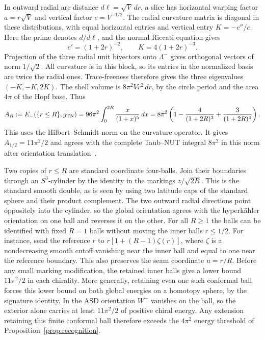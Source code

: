 \documentclass[11pt]{article}
\numberwithin{equation}{section}
\theoremstyle{definition}
\theoremstyle{remark}
\begin{document}
In outward radial arc distance \(d\ell=\sqrt V\,dr\), a slice has
horizontal warping factor \(a=r\sqrt V\) and vertical factor
\(c=V^{-1/2}\). The radial curvature matrix is diagonal in
these distributions, with equal horizontal entries and vertical
entry \(K=-c''/c\). Here the prime denotes \(d/d\ell\), and the
normal Riccati equation gives
\[
 c'=(1+2r)^{-2},\qquad K=4(1+2r)^{-3}.
\]
Projection of the three radial unit bivectors onto \(\Lambda^-\)
gives orthogonal vectors of norm \(1/\sqrt2\). All curvature is in
this block, so its entries in the normalized basis are twice the
radial ones. Trace-freeness therefore gives the three eigenvalues
\((-K,-K,2K)\). The shell volume is \(8\pi^2 Vr^2\,dr\), by the
circle period and the area \(4\pi\) of the Hopf base. Thus
\begin{equation}\label{wall:core-energy}
 A_R:=E_-(\{r\le R\},g_{\rm TN})
 =96\pi^2\int_0^{2R}\frac{x}{(1+x)^5}\,dx
 =8\pi^2\left(1-\frac4{(1+2R)^3}+\frac3{(1+2R)^4}\right).
\end{equation}
This uses the Hilbert--Schmidt norm on the curvature operator.
It gives \(A_{1/2}=11\pi^2/2\) and agrees with the complete
Taub--NUT integral \(8\pi^2\) in this norm after orientation
translation~\cite[\S2 and \S5, (5.11), (5.18)]{AtiyahLeBrun2013Curvature}.

Two copies of \(r\le R\) are standard coordinate four-balls.
Join their boundaries through an \(S^3\)-cylinder by the identity
in the markings \(z/\sqrt{2R}\). This is the standard smooth
double, as is seen by using two latitude caps of the standard
sphere and their product complement. The two outward radial
directions point oppositely into the cylinder, so the global
orientation agrees with the hyperkähler orientation on one
ball and reverses it on the other. For all \(R\ge1\) the balls
can be identified with fixed \(R=1\) balls without moving the
inner balls \(r\le1/2\). For instance, send the reference \(r\) to
\(r[1+(R-1)\zeta(r)]\), where \(\zeta\) is a nondecreasing smooth
cutoff vanishing near the inner ball and equal to one near
the reference boundary. This also preserves the seam coordinate
\(u=r/R\). Before any small marking modification, the retained
inner balls give a lower bound \(11\pi^2/2\) in each chirality.
More generally, retaining even one such conformal ball forces
this lower bound on both global energies on a homotopy sphere,
by the signature identity. In the ASD orientation \(W^+\) vanishes
on the ball, so the exterior alone carries at least \(11\pi^2/2\) of
positive chiral energy. Any extension retaining this finite conformal
ball therefore exceeds the \(4\pi^2\) energy threshold of
Proposition~\ref{prop:recognition}.
\end{document}
